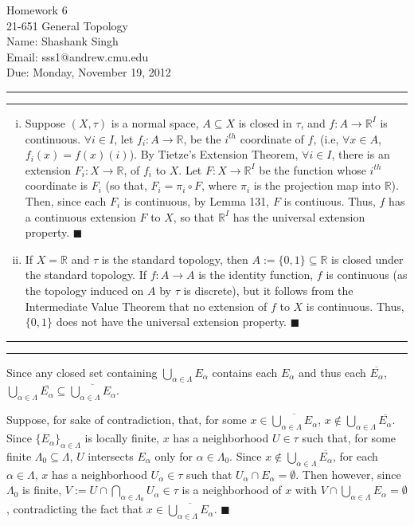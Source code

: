 \documentclass[11pt]{article}
\makeatletter
\newcounter{questionCounter}
\newcounter{partCounter}[questionCounter]
\newenvironment{question}[2][\arabic{questionCounter}]{%
    \setcounter{partCounter}{0}%
    \vspace{.25in} \hrule \vspace{0.5em}%
        \noindent{\bf #2}%
    \vspace{0.8em} \hrule \vspace{.10in}%
    \addtocounter{questionCounter}{1}%
}{}
\newcommand{\myname}{Shashank Singh}
\newcommand{\myandrew}{sss1@andrew.cmu.edu}
\newcommand{\myclass}{21-651 General Topology}
\newcommand{\myhwnum}{6}
\newcommand{\duedate}{Monday, November 19, 2012}
\renewcommand{\qed}{\quad $\blacksquare$}
\newcommand{\R}{\mathbb{R}} %
\makeatother
\begin{document}
\thispagestyle{plain}

{\Large Homework \myhwnum} \\
\myclass \\
Name: \myname \\
Email: \myandrew \\
Due: \duedate

\begin{question}{Problem 1}
\begin{enumerate}[(i)]
\item Suppose $(X,\tau)$ is a normal space, $A \subseteq X$ is
closed in $\tau$, and $f : A \rightarrow \R^I$ is continuous.
$\forall i \in I$, let $f_i : A \rightarrow \R$, be the $i^{th}$ coordinate of
$f$, (i.e, $\forall x \in A$, $f_i(x) = f(x) (i)$). By Tietze's Extension
Theorem, $\forall i \in I$, there is an extension $F_i : X \rightarrow \R$, of
$f_i$ to $X$. Let $F : X \rightarrow \R^I$ be the function whose $i^{th}$
coordinate is $F_i$ (so that, $F_i = \pi_i \circ F$, where $\pi_i$ is the
projection map into $\R$). Then, since each $F_i$ is continuous, by Lemma 131,
$F$ is contiuous. Thus, $f$ has a continuous extension $F$ to $X$, so that
$\R^I$ has the universal extension property. \qed

\item If $X = \R$ and $\tau$ is the standard topology, then
$A := \{0,1\} \subseteq \R$ is closed under the standard topology. If
$f : A \rightarrow A$ is the identity function, $f$ is continuous (as the
topology induced on $A$ by $\tau$ is discrete), but it follows from the
Intermediate Value Theorem that no extension of $f$ to $X$ is continuous.
Thus, $\{0,1\}$ does not have the universal extension property. \qed

\end{enumerate}
\end{question}

\begin{question}{Problem 2}
Since any closed set containing
$\displaystyle \bigcup_{\alpha \in \Lambda} E_{\alpha}$ contains each
$E_{\alpha}$ and thus each $\overline{E_{\alpha}}$,
$\displaystyle
\bigcup_{\alpha \in \Lambda} \overline{E_{\alpha}}
 \subseteq \overline{\bigcup_{\alpha \in \Lambda} E_{\alpha}}$.

Suppose, for sake of contradiction, that, for some
$x \in \overline{\bigcup_{\alpha \in \Lambda} E_{\alpha}}$,
$x \notin \bigcup_{\alpha \in \Lambda} \overline{E_{\alpha}}$. Since
$\{E_{\alpha}\}_{\alpha \in \Lambda}$ is locally finite, $x$ has a
neighborhood $U \in \tau$ such that, for some finite
$\Lambda_0 \subseteq \Lambda$, $U$ intersects $E_{\alpha}$ only for
$\alpha \in \Lambda_0$. Since
$x \notin \bigcup_{\alpha \in \Lambda} \overline{E_{\alpha}}$, for each
$\alpha \in \Lambda$, $x$ has a neighborhood $U_{\alpha} \in \tau$ such that
$U_{\alpha} \cap E_{\alpha} = \emptyset$. Then however, since $\Lambda_0$ is
finite, $V := U \cap \bigcap_{\alpha \in \Lambda_0} U_{\alpha} \in \tau$ is a
neighborhood of $x$ with
$V \cap \bigcup_{\alpha \in \Lambda} E_{\alpha} = \emptyset$,
contradicting the fact that
$x \in \overline{\bigcup_{\alpha \in \Lambda} E_{\alpha}}$. \qed
\end{question}
\end{document}
